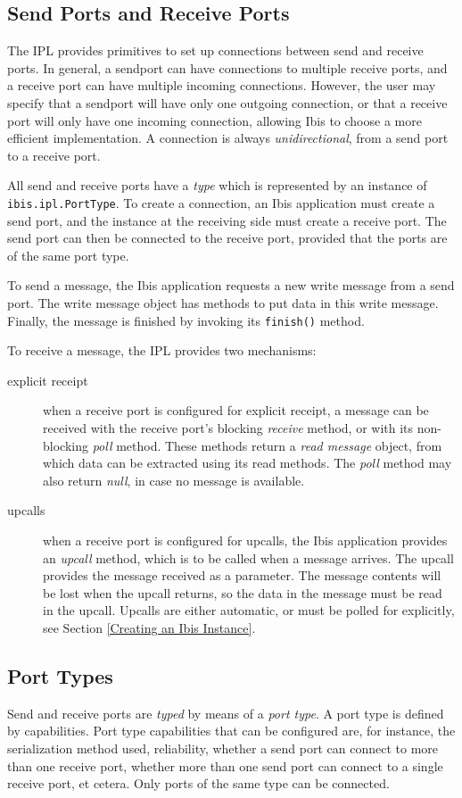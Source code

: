 \documentclass[10pt]{article}
\newcommand{\mysubsection}[1]{\subsection{#1}\label{#1}}
\begin{document}
\mysubsection{Send Ports and Receive Ports}

The IPL provides primitives to set up connections between send and receive
ports.
In general, a sendport can have connections to multiple receive ports,
and a receive port can have multiple incoming connections.
However, the user may specify that a sendport will have only one
outgoing connection, or that a receive port will only have one
incoming connection, allowing Ibis to choose a more efficient
implementation.  A connection is always \emph{unidirectional}, from
a send port to a receive port.

All send and receive ports have a \emph{type} which is represented by an
instance of \texttt{ibis.ipl.PortType}.
To create a connection, an Ibis application must create a send port,
and the instance at the receiving side must create a receive port.
The send port can then be connected to the receive port, provided
that the ports are of the same port type.

To send a message, the Ibis application requests a new write message from
a send port. The write message object has methods to put data in this write
message. Finally, the message is finished by invoking its \texttt{finish()}
method.

To receive a message, the IPL provides two mechanisms:
\begin{description}
\item[explicit receipt]
when a receive port is configured for explicit receipt, a message can be
received with the receive port's blocking \emph{receive} method,
or with its non-blocking \emph{poll} method.
These methods return a \emph{read message} object, from which data can
be extracted using its read methods. The \emph{poll} method may also
return \emph{null}, in case no message is available.
\item[upcalls]
when a receive port is configured for upcalls, the Ibis application provides
an \emph{upcall} method, which is to be called when a message arrives.
The upcall provides the message received as a parameter.
The message contents will be lost when the upcall returns, so the data
in the message must be read in the upcall.
Upcalls are either automatic, or must be polled for explicitly, see Section
\ref{Creating an Ibis Instance}.
\end{description}
\noindent

\mysubsection{Port Types}

Send and receive ports are \emph{typed} by means of a \emph{port type}.
A port type is defined by capabilities.
Port type capabilities that can be configured are, for instance, the
serialization method used, reliability, whether a send port can connect
to more than one receive port, whether more than one send port can connect
to a single receive port, et cetera.
Only ports of the same type can be connected.
\end{document}
